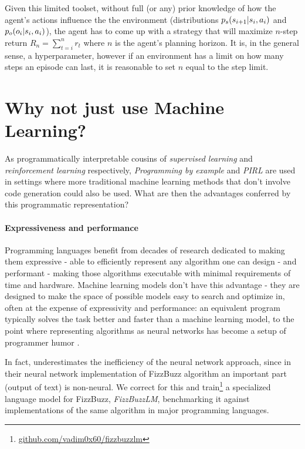 Given this limited toolset, without full (or any) prior knowledge of how the agent's actions influence the the environment (distributions $p_s(s_{i+1} | s_i, a_i)$ and $p_o(o_i | s_i, a_i)$), the agent has to come up with a strategy that will maximize $n$-step return $R_n=\sum_{t=i}^{n} r_t$ where $n$ is the agent's planning horizon. It is, in the general sense, a hyperparameter, however if an environment has a limit on how many steps an episode can last, it is reasonable to set $n$ equal to the step limit. 

\newpage
\section{Why not just use Machine Learning?}

As programmatically interpretable cousins of \emph{supervised learning} and \emph{reinforcement learning} respectively, \emph{Programming by example} and \emph{PIRL} are  used in settings where more traditional machine learning methods that don't involve code generation could also be used.
What are then the advantages conferred by this programmatic representation?

\paragraph{Expressiveness and performance}

Programming languages benefit from decades of research dedicated to making them \textcolor{accent}{expressive} - able to efficiently represent any algorithm one can design - and \textcolor{accent}{performant} - making those algorithms executable with minimal requirements of time and hardware.
Machine learning models don't have this advantage - they are designed to make the space of possible models easy to search and optimize in, often at the expense of expressivity and performance: an equivalent program typically solves the task better and faster than a machine learning model, to the point where representing algorithms as neural networks has become a setup of programmer humor \cite{JoelGrusFizz}.

In fact, \cite{JoelGrusFizz} underestimates the inefficiency of the neural network approach, since in their neural network implementation of FizzBuzz algorithm an important part (output of text) is non-neural.
We correct for this and train\footnote{\url{github.com/vadim0x60/fizzbuzzlm}} a specialized language model for FizzBuzz, \emph{FizzBuzzLM}, benchmarking it against implementations of the same algorithm in major programming languages.

